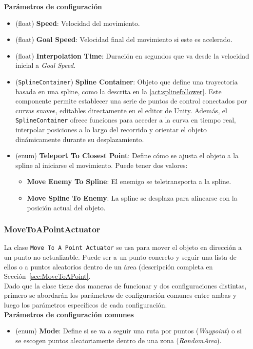 \textbf{Parámetros de configuración}
\begin{itemize}
	\item (float) \textbf{Speed}: Velocidad del movimiento.
	\item (float) \textbf{Goal Speed}: Velocidad final del movimiento si este es acelerado.
	\item (float) \textbf{Interpolation Time}: Duración en segundos que va desde la velocidad inicial a \textit{Goal Speed}.
	\item (\texttt{SplineContainer}) \textbf{Spline Container}: Objeto que define una trayectoria basada en una spline, como la descrita en la \autoref{act:splinefollower}. Este componente permite establecer una serie de puntos de control conectados por curvas suaves, editables directamente en el editor de Unity. Además, el \texttt{SplineContainer} ofrece funciones para acceder a la curva en tiempo real, interpolar posiciones a lo largo del recorrido y orientar el objeto dinámicamente durante su desplazamiento.
	\item (enum) \textbf{Teleport To Closest Point}: Define cómo se ajusta el objeto a la spline al iniciarse el movimiento. Puede tener dos valores:
	\begin{itemize}
		\item \textbf{Move Enemy To Spline}: El enemigo se teletransporta a la spline.
		\item \textbf{Move Spline To Enemy}: La spline se desplaza para alinearse con la posición actual del objeto.
	\end{itemize}
\end{itemize}

\subsubsection{MoveToAPointActuator}
La clase \texttt{Move To A Point Actuator} se usa para mover el objeto en dirección a un punto no actualizable. Puede ser a un punto concreto y seguir una lista de ellos o a puntos aleatorios dentro de un área (descripción completa en Sección~\ref{sec:MoveToAPoint}.\\
Dado que la clase tiene dos maneras de funcionar y dos configuraciones distintas, primero se abordarán los parámetros de configuración comunes entre ambas y luego los parámetros específicos de cada configuración.\\

\textbf{Parámetros de configuración comunes}
\begin{itemize} 
	\item (enum) \textbf{Mode}: Define si se va a seguir una ruta por puntos (\textit{Waypoint}) o si se escogen puntos aleatoriamente dentro de una zona (\textit{RandomArea}).
\end{itemize}	

